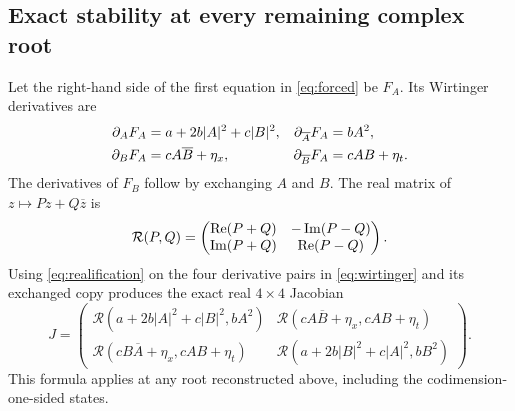 \subsection{Exact stability at every remaining complex root}

Let the right-hand side of the first equation in \eqref{eq:forced} be
$F_A$. Its Wirtinger derivatives are
\begin{align}
 \partial_A F_A&=a+2b|A|^2+c|B|^2,
 &\partial_{\overline A}F_A&=bA^2,\notag\\
 \partial_B F_A&=cA\overline B+\eta_x,
 &\partial_{\overline B}F_A&=cAB+\eta_t.
 \label{eq:wirtinger}
\end{align}
The derivatives of $F_B$ follow by exchanging $A$ and $B$. The real matrix
of $z\mapsto Pz+Q\overline z$ is
\begin{equation}
 \mathcal R(P,Q)=
 \begin{pmatrix}
 \operatorname{Re}(P+Q)&-\operatorname{Im}(P-Q)\\
 \operatorname{Im}(P+Q)& \operatorname{Re}(P-Q)
 \end{pmatrix}.
 \label{eq:realification}
\end{equation}
Using \eqref{eq:realification} on the four derivative pairs in
\eqref{eq:wirtinger} and its exchanged copy produces the exact real
$4\times4$ Jacobian
\begin{equation}
 J=\begin{pmatrix}
 \mathcal R(a+2b|A|^2+c|B|^2,bA^2)&
 \mathcal R(cA\overline B+\eta_x,cAB+\eta_t)\\
 \mathcal R(cB\overline A+\eta_x,cAB+\eta_t)&
 \mathcal R(a+2b|B|^2+c|A|^2,bB^2)
 \end{pmatrix}.
 \label{eq:full-forced-Jacobian}
\end{equation}
This formula applies at any root reconstructed above, including the
codimension-one-sided states.

